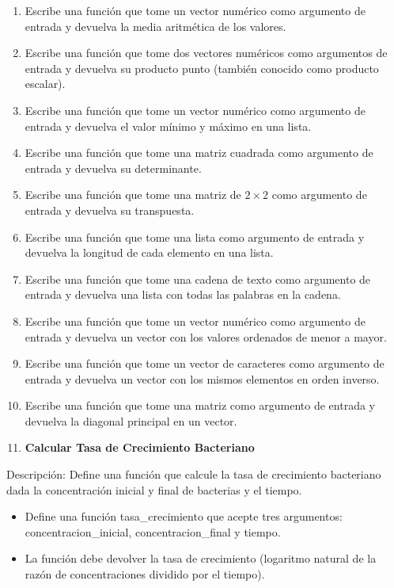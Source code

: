 \documentclass[
]{book}
\providecommand{\tightlist}{%
  \setlength{\itemsep}{0pt}\setlength{\parskip}{0pt}}
\begin{document}
\begin{enumerate}
\def\labelenumi{\arabic{enumi}.}
\item
  Escribe una función que tome un vector numérico como argumento de entrada y devuelva la media aritmética de los valores.
\item
  Escribe una función que tome dos vectores numéricos como argumentos de entrada y devuelva su producto punto (también conocido como producto escalar).
\item
  Escribe una función que tome un vector numérico como argumento de entrada y devuelva el valor mínimo y máximo en una lista.
\item
  Escribe una función que tome una matriz cuadrada como argumento de entrada y devuelva su determinante.
\item
  Escribe una función que tome una matriz de \(2 \times 2\) como argumento de entrada y devuelva su transpuesta.
\item
  Escribe una función que tome una lista como argumento de entrada y devuelva la longitud de cada elemento en una lista.
\item
  Escribe una función que tome una cadena de texto como argumento de entrada y devuelva una lista con todas las palabras en la cadena.
\item
  Escribe una función que tome un vector numérico como argumento de entrada y devuelva un vector con los valores ordenados de menor a mayor.
\item
  Escribe una función que tome un vector de caracteres como argumento de entrada y devuelva un vector con los mismos elementos en orden inverso.
\item
  Escribe una función que tome una matriz como argumento de entrada y devuelva la diagonal principal en un vector.
\item
  \textbf{Calcular Tasa de Crecimiento Bacteriano}
\end{enumerate}

Descripción: Define una función que calcule la tasa de crecimiento bacteriano dada la concentración inicial y final de bacterias y el tiempo.

\begin{itemize}
\tightlist
\item
  Define una función tasa\_crecimiento que acepte tres argumentos: concentracion\_inicial, concentracion\_final y tiempo.
\item
  La función debe devolver la tasa de crecimiento (logaritmo natural de la razón de concentraciones dividido por el tiempo).
\end{itemize}
\end{document}
